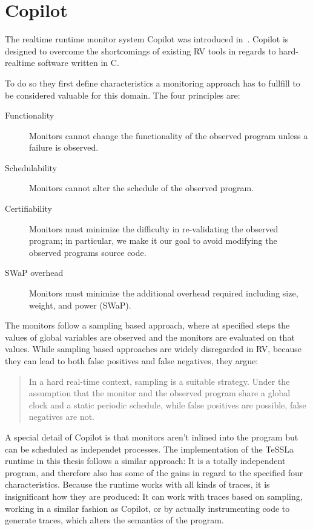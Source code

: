 \section{Copilot}
\label{sec:related:copilot}

The realtime runtime monitor system Copilot was introduced in~\cite{Pike2010}.
Copilot is designed to overcome the shortcomings of existing RV tools in regards to hard-realtime software written in C.

To do so they first define characteristics a monitoring approach has to fullfill to be considered valuable for this domain.
The four principles are:

\begin{description}
  \item[Functionality] Monitors cannot change the functionality of the observed program unless a failure is observed.
  \item[Schedulability] Monitors cannot alter the schedule of the observed program.
  \item[Certifiability] Monitors must minimize the difficulty in re-validating the observed program; in particular, we make it our goal to avoid modifying the observed programs source code.
  \item[SWaP overhead] Monitors must minimize the additional overhead required including size, weight, and power (SWaP).
\end{description}

The monitors follow a sampling based approach, where at specified steps the values of global variables are observed and the monitors are evaluated
on that values.
While sampling based approaches are widely disregarded in RV, because they can lead to both false positives and false negatives,
they argue:

\begin{quote}
  In a hard real-time context, sampling is a suitable strategy. Under
  the assumption that the monitor and the observed program share a global clock and a static periodic schedule, while false positives are possible, false negatives are not.~\cite{Pike2010}
\end{quote}

A special detail of Copilot is that monitors aren't inlined into the program but can be scheduled as independet processes.
The implementation of the TeSSLa runtime in this thesis follows a similar approach: It is a totally independent program,
and therefore also has some of the gains in regard to the specified four characteristics.
Because the runtime works with all kinds of traces, it is insignificant how they are produced:
It can work with traces based on sampling, working in a similar fashion as Copilot, or by actually instrumenting code to generate
traces, which alters the semantics of the program.

